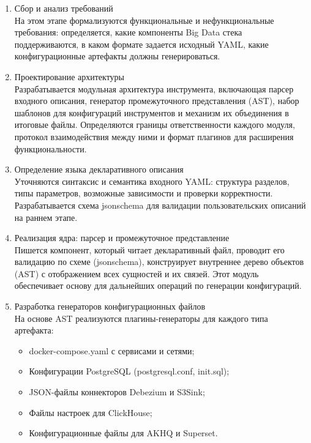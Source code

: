\begin{enumerate}[label=\textbf{Этап \arabic*.}]
      \item Сбор и анализ требований \\
            На этом этапе формализуются функциональные и нефункциональные требования: определяется, какие компоненты Big Data стека поддерживаются, в каком формате задается исходный YAML, какие конфигурационные артефакты должны генерироваться.
      \item  Проектирование архитектуры \\
            Разрабатывается модульная архитектура инструмента, включающая парсер входного описания, генератор промежуточного представления (AST), набор шаблонов для конфигураций инструментов и механизм их объединения в итоговые файлы. Определяются границы ответственности каждого модуля, протокол взаимодействия между ними и формат плагинов для расширения функциональности.
      \item  Определение языка декларативного описания \\
            Уточняются синтаксис и семантика входного YAML: структура разделов, типы параметров, возможные зависимости и проверки корректности. Разрабатывается схема jsonschema для валидации пользовательских описаний на раннем этапе.
      \item  Реализация ядра: парсер и промежуточное представление \\
            Пишется компонент, который читает декларативный файл, проводит его валидацию по схеме (jsonschema), конструирует внутреннее дерево объектов (AST) с отображением всех сущностей и их связей. Этот модуль обеспечивает основу для дальнейших операций по генерации конфигураций.
      \item Разработка генераторов конфигурационных файлов \\
            На основе AST реализуются плагины-генераторы для каждого типа артефакта:
            \begin{itemize}
                  \item docker-compose.yaml с сервисами и сетями;
                  \item Конфигурации PostgreSQL (postgresql.conf, init.sql);
                  \item JSON-файлы коннекторов Debezium и S3Sink;
                  \item Файлы настроек для ClickHouse;
                  \item Конфигурационные файлы для AKHQ и Superset.
            \end{itemize}

\end{enumerate}
